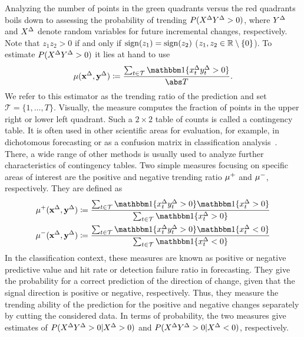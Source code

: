 Analyzing the number of points in the green quadrants versus the red quadrants boils down to assessing the probability of trending $P(X^{\Delta} Y^{\Delta} > 0)$, where $Y^{\Delta}$ and $X^{\Delta}$ denote random variables for future incremental changes, respectively.
Note that $z_1 z_2 > 0$ if and only if $\operatorname{sign}(z_1) = \operatorname{sign}(z_2)$ ($z_1, z_2 \in \mathbb{R} \setminus \{ 0 \}$).
To estimate $P(X^{\Delta} Y^{\Delta} > 0)$ it lies at hand to use
\begin{equation}
    \acc (\diffx, \diffy) \coloneqq \frac{\sum_{t \in \mathcal{T}} \ind{\diffxt \diffyt > 0}}{\card{T}}.\label{eq:acc}
\end{equation}
We refer to this estimator as the trending ratio of the prediction and set $\mathcal{T} = \{1, \dots, T\}$.
Visually, the measure computes the fraction of points in the upper right or lower left quadrant.
Such a $2 \times 2$ table of counts is called a contingency table.
It is often used in other scientific areas for evaluation, for example, in dichotomous forecasting or as a confusion matrix in classification analysis~\parencites(see, e.g., the introductions in)()[Ch. 4]{James2021}[Ch. 3]{Jolliffe2012}.
There, a wide range of other methods is usually used to analyze further characteristics of contingency tables.
Two simple measures focusing on specific areas of interest are the positive and negative trending ratio $\mu^+$ and $\mu^-$, respectively.
They are defined as
\begin{align}
    \accp (\diffx, \diffy) &\coloneqq \frac{\sum_{t \in \mathcal{T}} \ind{\diffxt \diffyt > 0} \ind{\diffxt > 0}}{\sum_{t \in \mathcal{T}} \ind{\diffxt > 0}} \label{eq:accp}\\
    \accm (\diffx, \diffy) &\coloneqq \frac{\sum_{t \in \mathcal{T}} \ind{\diffxt \diffyt > 0} \ind{\diffxt < 0}}{\sum_{t \in \mathcal{T}} \ind{\diffxt < 0}}\label{eq:accm}
\end{align}
In the classification context, these measures are known as positive or negative predictive value and hit rate or detection failure ratio in forecasting.
They give the probability for a correct prediction of the direction of change, given that the signal direction is positive or negative, respectively.
Thus, they measure the trending ability of the prediction for the positive and negative changes separately by cutting the considered data.
In terms of probability, the two measures give estimates of $P(X^{\Delta} Y^{\Delta} > 0 | X^{\Delta} > 0)$ and $P(X^{\Delta} Y^{\Delta} > 0 | X^{\Delta} < 0)$, respectively.

